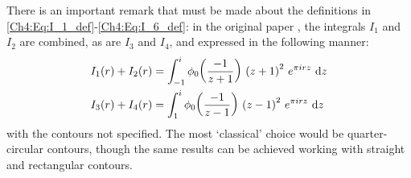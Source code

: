 There is an important remark that must be made about the definitions in \eqref{Ch4:Eq:I_1_def}-\eqref{Ch4:Eq:I_6_def}: in the original paper \cite{Viazovska8}, the integrals $I_1$ and $I_2$ are combined, as are $I_3$ and $I_4$, and expressed in the following manner:
\begin{align*}
    I_1(r) + I_2(r) &= \int_{-1}^{i} \phi_0\!\left( \frac{-1}{z+1} \right) \, \left( z + 1 \right)^2 \, e^{\pi i r z} \, \operatorname{d}\!{z} \\
    I_3(r) + I_4(r) &= \int_{1}^{i} \phi_0\!\left( \frac{-1}{z - 1} \right) \, \left( z - 1 \right)^2 \, e^{\pi i r z} \, \operatorname{d}\!{z}
\end{align*}
with the contours not specified. The most `classical' choice would be quarter-circular contours, though the same results can be achieved working with straight and rectangular contours.

